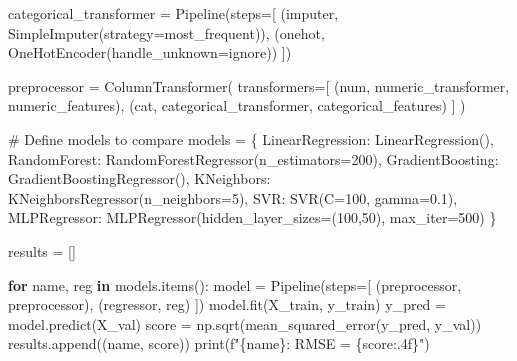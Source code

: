 \documentclass[
]{article}
\newenvironment{Shaded}{\begin{snugshade}}{\end{snugshade}}
\newcommand{\BuiltInTok}[1]{\textcolor[rgb]{0.00,0.23,0.31}{#1}}
\newcommand{\CommentTok}[1]{\textcolor[rgb]{0.37,0.37,0.37}{#1}}
\newcommand{\ControlFlowTok}[1]{\textcolor[rgb]{0.00,0.23,0.31}{\textbf{#1}}}
\newcommand{\DecValTok}[1]{\textcolor[rgb]{0.68,0.00,0.00}{#1}}
\newcommand{\FloatTok}[1]{\textcolor[rgb]{0.68,0.00,0.00}{#1}}
\newcommand{\KeywordTok}[1]{\textcolor[rgb]{0.00,0.23,0.31}{\textbf{#1}}}
\newcommand{\NormalTok}[1]{\textcolor[rgb]{0.00,0.23,0.31}{#1}}
\newcommand{\OperatorTok}[1]{\textcolor[rgb]{0.37,0.37,0.37}{#1}}
\newcommand{\SpecialCharTok}[1]{\textcolor[rgb]{0.37,0.37,0.37}{#1}}
\newcommand{\SpecialStringTok}[1]{\textcolor[rgb]{0.13,0.47,0.30}{#1}}
\newcommand{\StringTok}[1]{\textcolor[rgb]{0.13,0.47,0.30}{#1}}
\begin{document}
\begin{Shaded}
\begin{Highlighting}[]
\NormalTok{categorical\_transformer }\OperatorTok{=}\NormalTok{ Pipeline(steps}\OperatorTok{=}\NormalTok{[}
\NormalTok{    (}\StringTok{\textquotesingle{}imputer\textquotesingle{}}\NormalTok{, SimpleImputer(strategy}\OperatorTok{=}\StringTok{\textquotesingle{}most\_frequent\textquotesingle{}}\NormalTok{)),}
\NormalTok{    (}\StringTok{\textquotesingle{}onehot\textquotesingle{}}\NormalTok{, OneHotEncoder(handle\_unknown}\OperatorTok{=}\StringTok{\textquotesingle{}ignore\textquotesingle{}}\NormalTok{))}
\NormalTok{])}

\NormalTok{preprocessor }\OperatorTok{=}\NormalTok{ ColumnTransformer(}
\NormalTok{    transformers}\OperatorTok{=}\NormalTok{[}
\NormalTok{        (}\StringTok{\textquotesingle{}num\textquotesingle{}}\NormalTok{, numeric\_transformer, numeric\_features),}
\NormalTok{        (}\StringTok{\textquotesingle{}cat\textquotesingle{}}\NormalTok{, categorical\_transformer, categorical\_features)}
\NormalTok{    ]}
\NormalTok{)}

\CommentTok{\# Define models to compare}
\NormalTok{models }\OperatorTok{=}\NormalTok{ \{}
    \StringTok{\textquotesingle{}LinearRegression\textquotesingle{}}\NormalTok{: LinearRegression(),}
    \StringTok{\textquotesingle{}RandomForest\textquotesingle{}}\NormalTok{: RandomForestRegressor(n\_estimators}\OperatorTok{=}\DecValTok{200}\NormalTok{),}
    \StringTok{\textquotesingle{}GradientBoosting\textquotesingle{}}\NormalTok{: GradientBoostingRegressor(),}
    \StringTok{\textquotesingle{}KNeighbors\textquotesingle{}}\NormalTok{: KNeighborsRegressor(n\_neighbors}\OperatorTok{=}\DecValTok{5}\NormalTok{),}
    \StringTok{\textquotesingle{}SVR\textquotesingle{}}\NormalTok{: SVR(C}\OperatorTok{=}\DecValTok{100}\NormalTok{, gamma}\OperatorTok{=}\FloatTok{0.1}\NormalTok{),}
    \StringTok{\textquotesingle{}MLPRegressor\textquotesingle{}}\NormalTok{: MLPRegressor(hidden\_layer\_sizes}\OperatorTok{=}\NormalTok{(}\DecValTok{100}\NormalTok{,}\DecValTok{50}\NormalTok{), max\_iter}\OperatorTok{=}\DecValTok{500}\NormalTok{)}
\NormalTok{\}}

\NormalTok{results }\OperatorTok{=}\NormalTok{ []}

\ControlFlowTok{for}\NormalTok{ name, reg }\KeywordTok{in}\NormalTok{ models.items():}
\NormalTok{    model }\OperatorTok{=}\NormalTok{ Pipeline(steps}\OperatorTok{=}\NormalTok{[}
\NormalTok{        (}\StringTok{\textquotesingle{}preprocessor\textquotesingle{}}\NormalTok{, preprocessor),}
\NormalTok{        (}\StringTok{\textquotesingle{}regressor\textquotesingle{}}\NormalTok{, reg)}
\NormalTok{    ])}
\NormalTok{    model.fit(X\_train, y\_train)}
\NormalTok{    y\_pred }\OperatorTok{=}\NormalTok{ model.predict(X\_val)}
\NormalTok{    score }\OperatorTok{=}\NormalTok{ np.sqrt(mean\_squared\_error(y\_pred, y\_val))}
\NormalTok{    results.append((name, score))}
    \BuiltInTok{print}\NormalTok{(}\SpecialStringTok{f"}\SpecialCharTok{\{}\NormalTok{name}\SpecialCharTok{\}}\SpecialStringTok{: RMSE = }\SpecialCharTok{\{}\NormalTok{score}\SpecialCharTok{:.4f\}}\SpecialStringTok{"}\NormalTok{)}


\end{Highlighting}
\end{Shaded}
\end{document}
